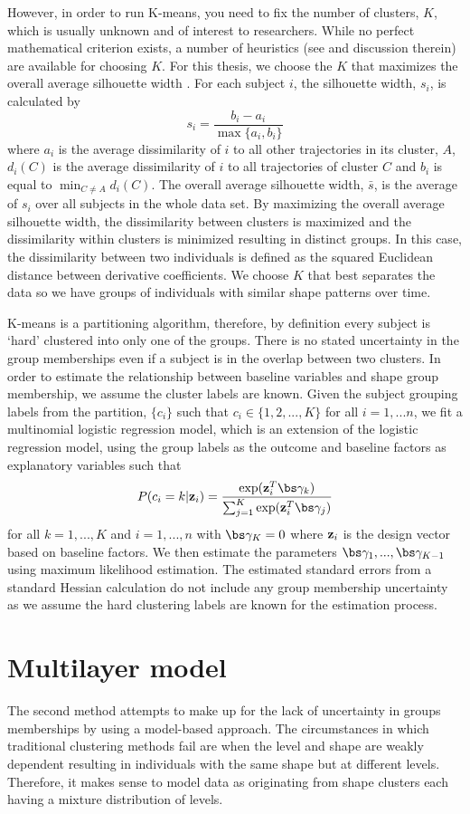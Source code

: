 However, in order to run K-means, you need to fix the number of clusters, $K$, which is usually unknown and of interest to researchers. While no perfect mathematical criterion exists, a number of heuristics (see \cite{tibshirani2001} and discussion therein) are available for choosing $K$. For this thesis, we choose the $K$ that maximizes the overall average silhouette width \cite{rousseeuw1987}.  For each subject $i$, the silhouette width, $s_{i}$, is calculated by
$$s_{i}=\frac{b_{i}-a_{i}}{\max\{a_{i},b_{i}\}}$$
where $a_{i}$ is the average dissimilarity of $i$ to all other trajectories in its cluster, $A$, $d_{i}(C)$ is the average dissimilarity of $i$ to all trajectories of cluster $C$ and $b_{i}$ is equal to $\min_{C\not= A} d_{i}(C)$. The overall average silhouette width, $\bar{s}$, is the average of $s_{i}$ over all subjects in the whole data set. By maximizing the overall average silhouette width, the dissimilarity between clusters is maximized and the dissimilarity within clusters is minimized resulting in distinct groups. In this case, the dissimilarity between two individuals is defined as the squared Euclidean distance between derivative coefficients. We choose $K$ that best separates the data so we have groups of individuals with similar shape patterns over time.

K-means is a partitioning algorithm, therefore, by definition every subject is `hard' clustered into only one of the groups. There is no stated uncertainty in the group memberships even if a subject is in the overlap between two clusters. In order to estimate the relationship between baseline variables and shape group membership, we assume the cluster labels are known. Given the subject grouping labels from the partition, $\{c_{i}\}$ such that $c_{i}\in\{1,2,...,K\}$ for all $i=1,...n$, we fit a multinomial logistic regression model, which is an extension of the logistic regression model, using the group labels as the outcome and baseline factors as explanatory variables such that
$$P(c_{i} = k|\B z_{i}) = \frac{\exp(\B z_{i}^{T}\bs\gamma_{k})}{\sum_{j=1}^{K}\exp(\B z_{i}^{T}\bs\gamma_{j})}$$
for all $k=1,...,K$ and $i=1,...,n$ with $\bs\gamma_{K}=0$ where $\mathbf z_{i}$ is the design vector based on baseline factors. We then estimate the parameters $\bs\gamma_{1},...,\bs\gamma_{K-1}$ using maximum likelihood estimation. The estimated standard errors from a standard Hessian calculation do not include any group membership uncertainty  as we assume the hard clustering labels are known for the estimation process.
\section{Multilayer model}
The second method attempts to make up for the lack of uncertainty in groups memberships by using a model-based approach. The circumstances in which traditional clustering methods fail are when the level and shape are weakly dependent resulting in individuals with the same shape but at different levels. Therefore, it makes sense to model data as originating from shape clusters each having a mixture distribution of levels.

